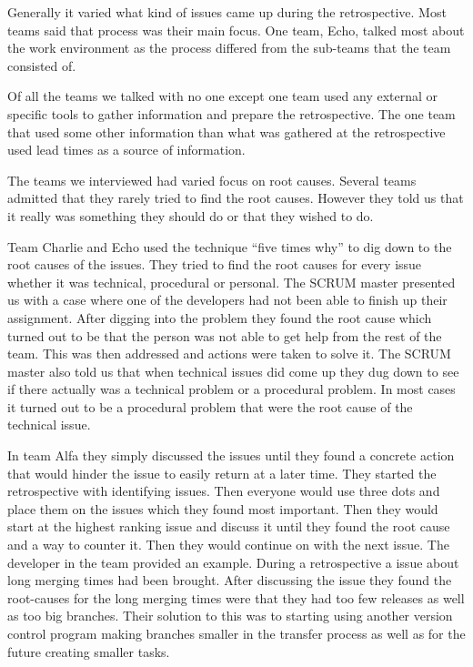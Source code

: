 Generally it varied what kind of issues came up during the retrospective. Most teams said that process was their main focus. One team, Echo, talked most about the work environment as the process differed from the sub-teams that the team consisted of. 

\label{question-12}
Of all the teams we talked with no one except one team used any external or specific tools to gather information and prepare the retrospective. The one team that used some other information than what was gathered at the retrospective used lead times as a source of information. 

\label{question-13} 
The teams we interviewed had varied focus on root causes. Several teams admitted that they rarely tried to find the root causes. However they told us that it really was something they should do or that they wished to do. 

Team Charlie and Echo used the technique ``five times why'' to dig down to the root causes of the issues. They tried to find the root causes for every issue whether it was technical, procedural or personal. The SCRUM master presented us with a case where one of the developers had not been able to finish up their assignment. After digging into the problem they found the root cause which turned out to be that the person was not able to get help from the rest of the team. This was then addressed and actions were taken to solve it. The SCRUM master also told us that when technical issues did come up they dug down to see if there actually was a technical problem or a procedural problem. In most cases it turned out to be a procedural problem that were the root cause of the technical issue.

In team Alfa they simply discussed the issues until they found a concrete action that would hinder the issue to easily return at a later time. They started the retrospective with identifying issues. Then everyone would use three dots and place them on the issues which they found most important. Then they would start at the highest ranking issue and discuss it until they found the root cause and a way to counter it. Then they would continue on with the next issue. The developer in the team provided an example. During a retrospective a issue about long merging times had been brought. After discussing the issue they found the root-causes for the long merging times were that they had too few releases as well as too big branches. Their solution to this was to starting using another version control program making branches smaller in the transfer process as well as for the future creating smaller tasks. 

